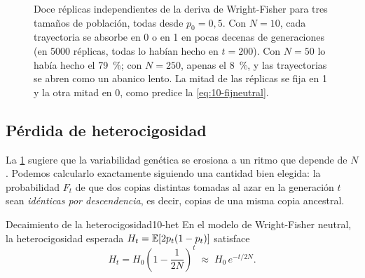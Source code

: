 \begin{figure}[t]
\centering
{}
\caption[Trayectorias de Wright-Fisher]{Doce réplicas independientes de la deriva de Wright-Fisher para tres tamaños de población, todas desde $p_0=0{,}5$. Con $N=10$, cada trayectoria se absorbe en 0 o en 1 en pocas decenas de generaciones (en \num{5000} réplicas, todas lo habían hecho en $t=200$). Con $N=50$ lo había hecho el \SI{79}{\percent}; con $N=250$, apenas el \SI{8}{\percent}, y las trayectorias se abren como un abanico lento. La mitad de las réplicas se fija en 1 y la otra mitad en 0, como predice la \cref{eq:10-fijneutral}.}
\label{fig:10-wf}
\end{figure}

\subsection{Pérdida de heterocigosidad}

La \cref{fig:10-wf} sugiere que la variabilidad genética se erosiona a un ritmo que depende de $N$. Podemos calcularlo exactamente siguiendo una cantidad bien elegida: la probabilidad $F_t$ de que dos copias distintas tomadas al azar en la generación $t$ sean \emph{idénticas por descendencia}, es decir, copias de una misma copia ancestral.

\begin{teorema}{Decaimiento de la heterocigosidad}{10-het}
En el modelo de Wright-Fisher neutral, la heterocigosidad esperada $H_t=\mathbb{E}[2p_t(1-p_t)]$ satisface
\begin{equation}\label{eq:10-het}
H_t = H_0\left(1-\frac{1}{2N}\right)^{t}\;\approx\; H_0\,e^{-t/2N}.
\end{equation}
\end{teorema}

